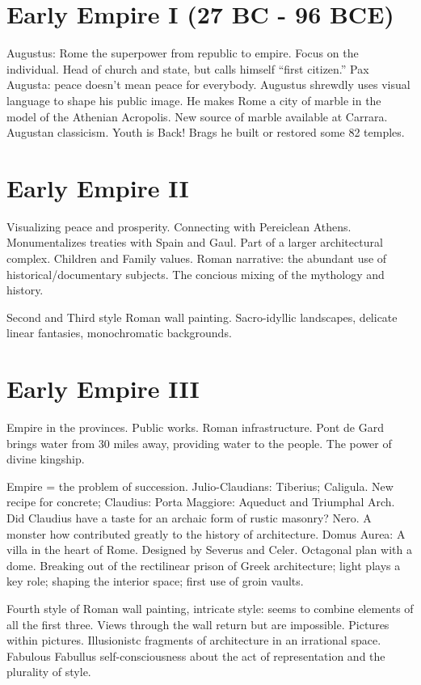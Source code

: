 \documentclass[10pt]{armath}
\begin{document}
\begin{multicols}{2}
\section{Early Empire I (27 BC - 96 BCE)}%
\label{sec:early_empire_i}

Augustus: Rome the superpower from republic to empire. Focus on the individual.
Head of church and state, but calls himself ``first citizen.'' Pax Augusta:
peace doesn't mean peace for everybody. Augustus shrewdly uses visual language
to shape his public image. He makes Rome a city of marble in the model of the
Athenian Acropolis. New source of marble available at Carrara. Augustan
classicism. Youth is Back! Brags he built or restored some 82 temples.

\section{Early Empire II}%
\label{sec:early_empire II}

Visualizing peace and prosperity. Connecting with Pereiclean Athens.
Monumentalizes treaties with Spain and Gaul. Part of a larger architectural
complex. Children and Family values. Roman narrative: the abundant use of
historical/documentary subjects. The concious mixing of the mythology and
history.

Second and Third style Roman wall painting. Sacro-idyllic landscapes, delicate
linear fantasies, monochromatic backgrounds.

\section{Early Empire III}%
\label{sec:early_empire_iii}

Empire in the provinces. Public works. Roman infrastructure. Pont de Gard
brings water from 30 miles away, providing water to the people. The power of
divine kingship.

Empire = the problem of succession. Julio-Claudians: Tiberius; Caligula. New
recipe for concrete; Claudius: Porta Maggiore: Aqueduct and Triumphal Arch. Did
Claudius have a taste for an archaic form of rustic masonry?
Nero. A monster how contributed greatly to the history of architecture. Domus
Aurea: A villa in the heart of Rome. Designed by Severus and Celer. Octagonal
plan with a dome. Breaking out of the rectilinear prison of Greek architecture;
light plays a key role; shaping the interior space; first use of groin vaults.

Fourth style of Roman wall painting, intricate style: seems to combine elements
of all the first three. Views through the wall return but are impossible.
Pictures within pictures. Illusionistc fragments of architecture in an
irrational space. Fabulous Fabullus self-consciousness about the act of
representation and the plurality of style.


\end{multicols}
\end{document}
